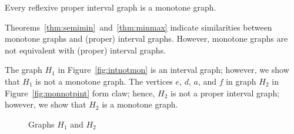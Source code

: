 \begin{cor} \label{cor:pintmon}
Every reflexive proper interval graph is a monotone graph.
\end{cor}

Theorems~\ref{thm:semimin}~and~\ref{thm:minmax} indicate similarities between
monotone graphs and (proper) interval graphs. However, monotone graphs are not
equivalent with (proper) interval graphs.

\begin{example} \label{exm:diff}
The graph \(H_1\) in Figure~\ref{fig:intnotmon} is 
an interval graph; however, we show that \(H_1\) is not a monotone graph.
The vertices \(e\), \(d\), \(a\), and \(f\) in graph \(H_2\) in Figure~\ref{fig:monnotpint} 
form claw; hence, \(H_2\) is not a proper interval graph; however, we show that
\(H_2\) is a monotone graph.

\begin{figure}[h]
\hspace{2cm}
\subfigure[\ensuremath{H_1}]{\label{fig:intnotmon}}\hspace{4cm}
\subfigure[\ensuremath{H_2}]{\label{fig:monnotpint}}
\caption{Graphs \ensuremath{H_1} and \ensuremath{H_2}}
\end{figure}


\end{example}

